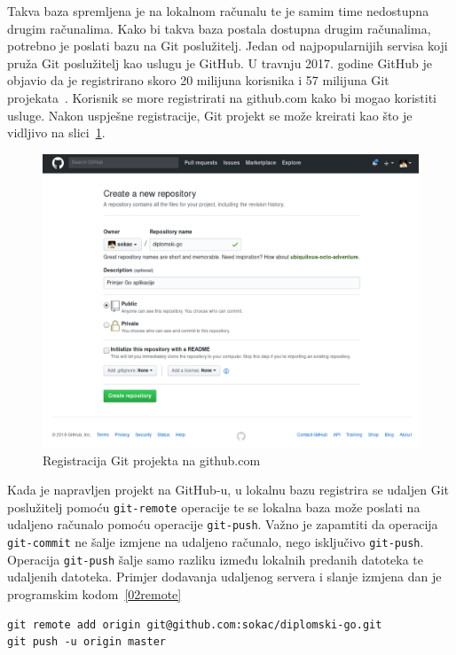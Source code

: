 Takva baza spremljena je na lokalnom računalu te je samim time nedostupna drugim računalima. Kako bi
takva baza postala dostupna drugim računalima, potrebno je poslati bazu na Git poslužitelj. Jedan od
najpopularnijih servisa koji pruža Git poslužitelj kao uslugu je GitHub.  U travnju 2017. godine
GitHub je objavio da je registrirano skoro 20 milijuna korisnika i 57 milijuna Git
projekata~\citep{github2017}. Korisnik se more registrirati na github.com kako bi mogao koristiti
usluge. Nakon uspješne registracije, Git projekt se može kreirati kao što je vidljivo na
slici~\ref{fig:02hgreg}.

\begin{figure}[h]
    \centering
    \includegraphics[width=\linewidth]{img/02/gh.png}
    \caption{Registracija Git projekta na github.com}%
    \label{fig:02hgreg}
\end{figure}

Kada je napravljen projekt na GitHub-u, u lokalnu bazu registrira se udaljen Git poslužitelj pomoću
\texttt{git-remote} operacije te se lokalna baza može poslati na udaljeno računalo pomoću operacije
\texttt{git-push}. Važno je zapamtiti da operacija \texttt{git-commit} ne šalje izmjene na udaljeno
računalo, nego isključivo \texttt{git-push}.  Operacija \texttt{git-push} šalje samo razliku između
lokalnih predanih datoteka te udaljenih datoteka.  Primjer dodavanja udaljenog servera i slanje
izmjena dan je programskim kodom~\ref{02remote}

\begin{lstlisting}[float=h]
git remote add origin git@github.com:sokac/diplomski-go.git
git push -u origin master
\end{lstlisting}

